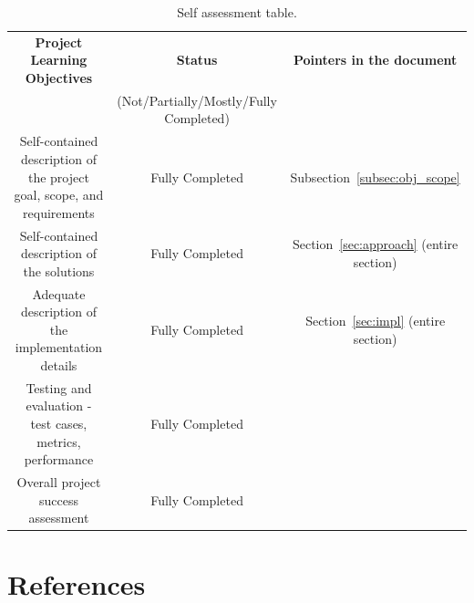 \documentclass[conference]{IEEEtran}
\begin{document}
    \begin{table}[b]
        \centering
        \caption{Self assessment table.}
        \label{tab:self-assmt}
        \begin{tabular}{|c|c|c|}
            \hline
            \textbf{Project Learning Objectives} & \textbf{Status} & \textbf{Pointers in the document} \\
             & (Not/Partially/Mostly/Fully Completed) &  \\
            \hline
            Self-contained description of the project goal, scope, and requirements & Fully Completed & Subsection~\ref{subsec:obj_scope} \\
            \hline
            Self-contained description of the solutions & Fully Completed & Section~\ref{sec:approach} (entire section)\\
            \hline
            Adequate description of the implementation details & Fully Completed & Section~\ref{sec:impl} (entire section)\\
            \hline
            Testing and evaluation - test cases, metrics, performance & Fully Completed & \\
            \hline
            Overall project success assessment & Fully Completed & \\
            \hline
        \end{tabular}

    \end{table}

    \section{References}
    
    
\end{document}
